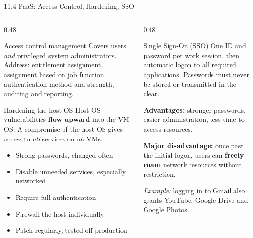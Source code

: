 \documentclass[11pt,aspectratio=169]{beamer}
\newcommand{\kw}[1]{\textbf{\color{accent}#1}}
\begin{document}
\begin{frame}{11.4 PaaS: Access Control, Hardening, SSO}
  \begin{columns}[T,onlytextwidth]
    \begin{column}{0.48\textwidth}
      \begin{block}{Access control management}
        \scriptsize
        Covers users \emph{and} privileged system administrators. Address:
        entitlement assignment, assignment based on job function,
        authentication method and strength, auditing and reporting.
      \end{block}
      \vspace{0.1em}
      \begin{block}{Hardening the host OS}
        \scriptsize
        Host OS vulnerabilities \kw{flow upward} into the VM OS. A compromise
        of the host OS gives access to \emph{all} services on \emph{all} VMs.
        \begin{itemize}\scriptsize\setlength{\itemsep}{0.05em}\setlength{\topsep}{0.2em}
          \item Strong passwords, changed often
          \item Disable unneeded services, especially networked
          \item Require full authentication
          \item Firewall the host individually
          \item Patch regularly, tested off production
        \end{itemize}
      \end{block}
    \end{column}
    \begin{column}{0.48\textwidth}
      \begin{block}{Single Sign-On (SSO)}
        \scriptsize
        One ID and password per work session, then automatic logon to all
        required applications. Passwords must never be stored or transmitted in
        the clear.
        \vspace{0.35em}

        \textbf{Advantages:} stronger passwords, easier administration, less
        time to access resources.
        \vspace{0.3em}

        \textbf{Major disadvantage:} once past the initial logon, users can
        \kw{freely roam} network resources without restriction.
        \vspace{0.35em}

        \emph{Example:} logging in to Gmail also grants YouTube, Google Drive
        and Google Photos.
      \end{block}
    \end{column}
  \end{columns}
\end{frame}
\end{document}

